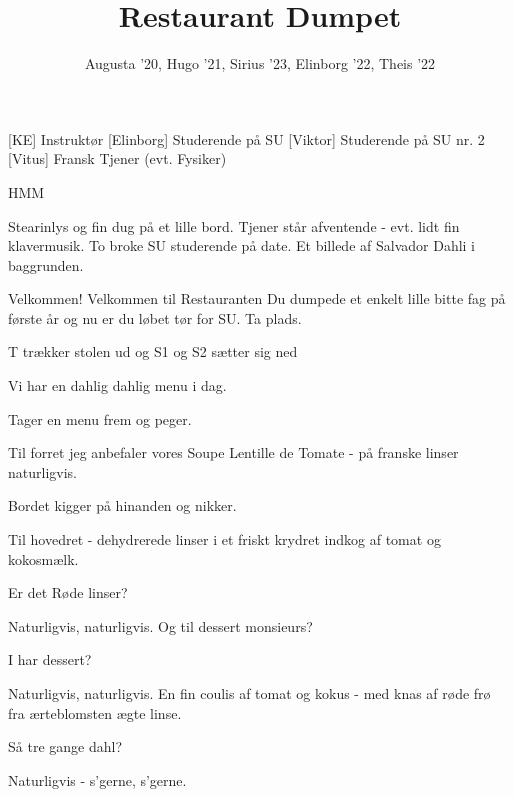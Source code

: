 \documentclass[a4paper,11pt]{article}
\title{Restaurant Dumpet}
\author{Augusta '20, Hugo '21, Sirius '23, Elinborg '22, Theis '22}
\begin{document}
\maketitle

\begin{roles}
[KE] Instruktør
[Elinborg] Studerende på SU
[Viktor] Studerende på SU nr. 2
[Vitus] Fransk Tjener (evt. Fysiker)
\end{roles}

\begin{props}
 HMM
\end{props}


\begin{sketch}


\scene Stearinlys og fin dug på et lille bord. Tjener står afventende - evt. lidt fin klavermusik. To broke SU studerende på date. Et billede af Salvador Dahli i baggrunden.

 Velkommen! Velkommen til Restauranten Du dumpede et enkelt lille bitte fag på første år og nu er du løbet tør for SU. Ta plads. 

\scene T trækker stolen ud og S1 og S2 sætter sig ned

 Vi har en dahlig dahlig menu i dag.

\scene Tager en menu frem og peger.

 Til forret jeg anbefaler vores Soupe Lentille de Tomate - på franske linser naturligvis.

\scene Bordet kigger på hinanden og nikker.

 Til hovedret - dehydrerede linser i et friskt krydret indkog af tomat og kokosmælk.

 Er det Røde linser?

 Naturligvis, naturligvis. Og til dessert monsieurs?

 I har dessert?

 Naturligvis, naturligvis. En fin coulis af tomat og kokus - med knas af røde frø fra ærteblomsten ægte linse.

 Så tre gange dahl?

 Naturligvis - s'gerne, s'gerne.
\end{sketch}
\end{document}
